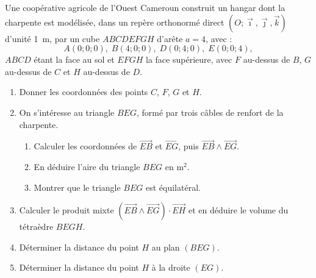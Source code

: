 \documentclass[11pt]{article}
\begin{document}
\begin{exercice}
Une coopérative agricole de l'Ouest Cameroun construit un hangar dont la charpente est modélisée, dans un repère orthonormé direct $(O ; \vec{\imath}, \vec{\jmath}, \vec{k})$ d'unité \SI{1}{m}, par un cube $ABCDEFGH$ d'arête $a = 4$, avec :
\[ A(0;0;0),\; B(4;0;0),\; D(0;4;0),\; E(0;0;4), \]
$ABCD$ étant la face au sol et $EFGH$ la face supérieure, avec $F$ au-dessus de $B$, $G$ au-dessus de $C$ et $H$ au-dessus de $D$.
\begin{enumerate}
\item Donner les coordonnées des points $C$, $F$, $G$ et $H$.
\item On s'intéresse au triangle $BEG$, formé par trois câbles de renfort de la charpente.
\begin{enumerate}
\item Calculer les coordonnées de $\overrightarrow{EB}$ et $\overrightarrow{EG}$, puis $\overrightarrow{EB} \wedge \overrightarrow{EG}$.
\item En déduire l'aire du triangle $BEG$ en $\mathrm{m}^2$.
\item Montrer que le triangle $BEG$ est équilatéral.
\end{enumerate}
\item Calculer le produit mixte $\left(\overrightarrow{EB} \wedge \overrightarrow{EG}\right) \cdot \overrightarrow{EH}$ et en déduire le volume du tétraèdre $BEGH$.
\item Déterminer la distance du point $H$ au plan $(BEG)$.
\item Déterminer la distance du point $H$ à la droite $(EG)$.
\end{enumerate}
\end{exercice}
\end{document}
